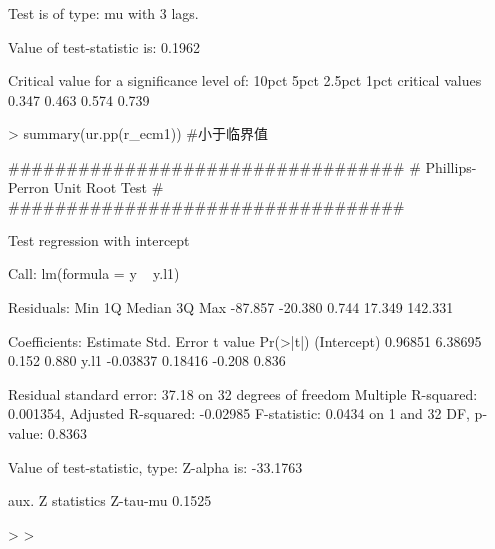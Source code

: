 \documentclass{article}
\begin{document}
\begin{Schunk}
\begin{Soutput}
Test is of type: mu with 3 lags. 

Value of test-statistic is: 0.1962 

Critical value for a significance level of: 
                10pct  5pct 2.5pct  1pct
critical values 0.347 0.463  0.574 0.739
\end{Soutput}
\begin{Sinput}
> summary(ur.pp(r_ecm1)) #小于临界值
\end{Sinput}
\begin{Soutput}
################################## 
# Phillips-Perron Unit Root Test # 
################################## 

Test regression with intercept 


Call:
lm(formula = y ~ y.l1)

Residuals:
    Min      1Q  Median      3Q     Max 
-87.857 -20.380   0.744  17.349 142.331 

Coefficients:
            Estimate Std. Error t value Pr(>|t|)
(Intercept)  0.96851    6.38695   0.152    0.880
y.l1        -0.03837    0.18416  -0.208    0.836

Residual standard error: 37.18 on 32 degrees of freedom
Multiple R-squared:  0.001354,	Adjusted R-squared:  -0.02985 
F-statistic: 0.0434 on 1 and 32 DF,  p-value: 0.8363


Value of test-statistic, type: Z-alpha  is: -33.1763 

         aux. Z statistics
Z-tau-mu            0.1525
\end{Soutput}
\begin{Sinput}
> 
> 
\end{Sinput}
\end{Schunk}
\end{document}
